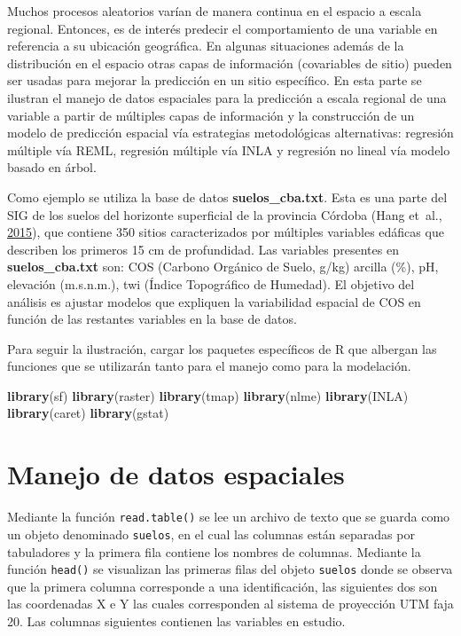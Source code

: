 \documentclass[11pt,b5paper,]{krantz}
\newenvironment{Shaded}{}{}
\newcommand{\KeywordTok}[1]{\textcolor[rgb]{0.00,0.44,0.13}{\textbf{#1}}}
\newcommand{\NormalTok}[1]{#1}
\begin{document}
Muchos procesos aleatorios varían de manera continua en el espacio a escala regional. Entonces, es de interés predecir el comportamiento de una variable en referencia a su ubicación geográfica. En algunas situaciones además de la distribución en el espacio otras capas de información (covariables de sitio) pueden ser usadas para mejorar la predicción en un sitio específico. En esta parte se ilustran el manejo de datos espaciales para la predicción a escala regional de una variable a partir de múltiples capas de información y la construcción de un modelo de predicción espacial vía estrategias metodológicas alternativas: regresión múltiple vía REML, regresión múltiple vía INLA y regresión no lineal vía modelo basado en árbol.

Como ejemplo se utiliza la base de datos \textbf{suelos\_cba.txt}. Esta es una parte del SIG de los suelos del horizonte superficial de la provincia Córdoba (Hang et~al., \protect\hyperlink{ref-Hang2015}{2015}), que contiene 350 sitios caracterizados por múltiples variables edáficas que describen los primeros 15 cm de profundidad. Las variables presentes en \textbf{suelos\_cba.txt} son: COS (Carbono Orgánico de Suelo, g/kg) arcilla (\%), pH, elevación (m.s.n.m.), twi (Índice Topográfico de Humedad). El objetivo del análisis es ajustar modelos que expliquen la variabilidad espacial de COS en función de las restantes variables en la base de datos.

Para seguir la ilustración, cargar los paquetes específicos de R que albergan las funciones que se utilizarán tanto para el manejo como para la modelación.

\begin{Shaded}
\begin{Highlighting}[]
\KeywordTok{library}\NormalTok{(sf)}
\KeywordTok{library}\NormalTok{(raster)}
\KeywordTok{library}\NormalTok{(tmap)}
\KeywordTok{library}\NormalTok{(nlme)}
\KeywordTok{library}\NormalTok{(INLA)}
\KeywordTok{library}\NormalTok{(caret)}
\KeywordTok{library}\NormalTok{(gstat)}
\end{Highlighting}
\end{Shaded}

\hypertarget{manejo-de-datos-espaciales-1}{%
\section{Manejo de datos espaciales}\label{manejo-de-datos-espaciales-1}}

Mediante la función \texttt{read.table()} se lee un archivo de texto que se guarda como un objeto denominado \texttt{suelos}, en el cual las columnas están separadas por tabuladores y la primera fila contiene los nombres de columnas. Mediante la función \texttt{head()} se visualizan las primeras filas del objeto \texttt{suelos} donde se observa que la primera columna corresponde a una identificación, las siguientes dos son las coordenadas X e Y las cuales corresponden al sistema de proyección UTM faja 20. Las columnas siguientes contienen las variables en estudio.
\end{document}

